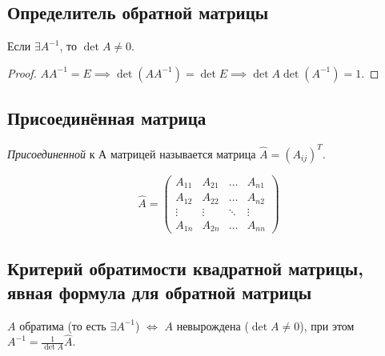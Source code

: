 \subsection{Определитель обратной матрицы}
\begin{lemma}
    Если $\exists A^{-1}$, то $\det A \neq 0$.
\end{lemma}

\begin{proof}
    $AA^{-1} = E \implies \det(AA^{-1}) = \det E \implies \det A \det(A^{-1}) = 1$.
\end{proof}


\subsection{Присоединённая матрица}
\begin{definition}
    \textit{Присоединенной} к А матрицей называется матрица $\widehat{A} = (A_{ij})^T$.
\end{definition}

\begin{equation*}
    \widehat{A} = \begin{pmatrix}
        A_{11} & A_{21} & \dots & A_{n1} \\
        A_{12} & A_{22} & \dots & A_{n2} \\
        \vdots & \vdots & \ddots & \vdots \\
        A_{1n} & A_{2n} & \dots & A_{nn}
    \end{pmatrix}
\end{equation*}


\subsection{Критерий обратимости квадратной матрицы, явная формула для обратной матрицы}
\begin{theorem}
    $A$ обратима (то есть $\exists A^{-1}$) $\iff$ $A$ невырождена ($\det A \neq 0$), при этом $A^{-1} = \frac{1}{\det A} \widehat{A}$.
\end{theorem}

